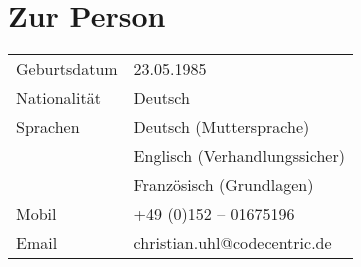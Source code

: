 \section*{Zur Person}
\begin{tabular}{@{}p{6cm}p{10cm}}
Geburtsdatum 	& 23.05.1985\\
Nationalität 	& Deutsch\\
Sprachen 	& Deutsch (Muttersprache)\\
		& Englisch (Verhandlungssicher)\\
		& Französisch (Grundlagen)\\
Mobil		& +49 (0)152 – 01675196\\
Email		& christian.uhl@codecentric.de
\end{tabular}
